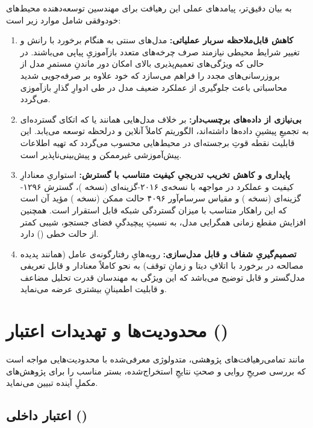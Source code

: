 \documentclass[oneside,openany,phd]{TMU-Thesis}
\begin{document}
به بیان دقیق‌تر، پیامدهای عملی این رهیافت برای مهندسین توسعه‌دهنده محیط‌های خودوفقی شامل موارد زیر است:

\begin{enumerate}
  \item \textbf{کاهش قابل‌ملاحظه سربار عملیاتی:} مدل‌های سنتی به هنگام برخورد با رانش و تغییر شرایط محیطی نیازمند صرف چرخه‌های متعدد بازآموزیِ پیاپی می‌باشند. در حالی که ویژگی‌های تعمیم‌پذیری بالای  امکان دور ماندنِ مستمرِ مدل از بروزرسانی‌های مجدد را فراهم می‌سازد که خود علاوه بر صرفه‌جویی شدید محاسباتی باعث جلوگیری از عملکرد ضعیف مدل در طی ادوارِ گذارِ بازآموزی می‌گردد.
  \item \textbf{بی‌نیازی از داده‌های برچسب‌دار:} بر خلاف مدل‌هایی همانند  یا  که اتکای گسترده‌ای به تجمیعِ پیشینِ داده‌ها داشته‌اند، الگوریتم  کاملاً آنلاین و درلحظه توسعه می‌یابد. این قابلیت نقطه قوتِ برجسته‌ای در محیط‌هایی محسوب می‌گردد که تهیه اطلاعات پیش‌آموزشی غیرممکن و پیش‌بینی‌ناپذیر است.
  \item \textbf{پایداری و کاهش تخریب تدریجیِ کیفیت متناسب با گسترش:} استواریِ معنادارِ کیفیت و عملکرد در مواجهه با نسخه‌ی ۲۰۱۶-گزینه‌ای (نسخه )، گسترش ۱۲۹۶-گزینه‌ای (نسخه ) و مقیاس سرسام‌آور ۴۰۹۶ حالت ممکن (نسخه ) مؤید آن است که این راهکار متناسب با میزان گستردگی شبکه قابل استقرار است. همچنین افزایش مقطع زمانی همگرایی مدل، به نسبتِ پیچیدگیِ فضای جستجو، شیبی کمتر از حالت خطی () دارد.
  \item \textbf{تصمیم‌گیریِ شفاف و قابل مدل‌سازی:} رویه‌هایِ رفتارگونه‌ی عامل (همانند پدیده مصالحه در برخورد با اتلافِ دیتا و زمانِ توقف) به نحو کاملاً معنا‌دار و قابل تعریفی مدل‌گستر و قابل توضیح می‌باشد که این ویژگی به مهندسان قدرت تحلیل مضاعف و قابلیت اطمینانِ بیشتری عرضه می‌نماید.
\end{enumerate}

\section{محدودیت‌ها و تهدیدات اعتبار ()}

مانند تمامی‌رهیافت‌های پژوهشی، متدولوژی معرفی‌شده با محدودیت‌هایی مواجه است که بررسی صریحِ روایی و صحتِ نتایجِ استخراج‌شده، بستر مناسب را برای پژوهش‌های مکملِ آینده تبیین می‌نماید.

\subsection{اعتبار داخلی ()}
\end{document}
